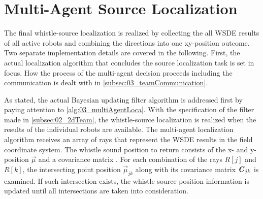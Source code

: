 \section{Multi-Agent Source Localization}
\label{sec:03_multiAgentLoca}

The final whistle-source localization is realized by collecting the
all \ac{WSDE} results of all active robots and combining the directions
into one xy-position outcome.
Two separate implementation details are covered in the following.
First, the actual localization algorithm that concludes the source localization
task is set in focus.
How the process of the multi-agent decision proceeds including the communication
is dealt with in \cref{subsec:03_teamCommunication}.

As stated, the actual Bayesian updating filter algorithm is addressed first
by paying attention to \cref{alg:03_multiAgentLoca}.
With the specification of the filter made in \cref{subsec:02_2dTeam}, the
whistle-source localization is realized when the results of the individual robots
are available.
The multi-agent localization algorithm receives an array of rays that represent
the \ac{WSDE} results in the field coordinate system.
The whistle sound position to return consists of the x- and y-position $\vec{\mu}$ and
a covariance matrix .
For each combination of the rays $R[j]$ and $R[k]$, the intersecting point position
$\vec{\mu}_{jk}$ along with its covariance matrix $\textbf{\textit{C}}_{jk}$ is examined.
If such intersection exists, the whistle source position information is updated until all intersections are taken into consideration.

